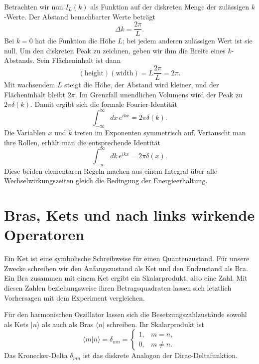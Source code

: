 Betrachten wir nun \(I_L(k)\) als Funktion auf der diskreten Menge der zulässigen \(k\)-Werte. Der Abstand benachbarter Werte beträgt
\begin{equation}
\Delta k=\frac{2\pi}{L}.
\end{equation}
Bei \(k=0\) hat die Funktion die Höhe \(L\); bei jedem anderen zulässigen Wert ist sie null. Um den diskreten Peak zu zeichnen, geben wir ihm die Breite eines \(k\)-Abstands. Sein Flächeninhalt ist dann
\begin{equation}
(\text{height})(\text{width})
=L\frac{2\pi}{L}=2\pi.
\end{equation}
Mit wachsendem \(L\) steigt die Höhe, der Abstand wird kleiner, und der Flächeninhalt bleibt \(2\pi\). Im Grenzfall unendlichen Volumens wird der Peak zu \(2\pi\delta(k)\). Damit ergibt sich die formale Fourier-Identität
\begin{equation}
\int_{-\infty}^{\infty}dx\,e^{ikx}=2\pi\delta(k).
\end{equation}
Die Variablen \(x\) und \(k\) treten im Exponenten symmetrisch auf. Vertauscht man ihre Rollen, erhält man die entsprechende Identität
\begin{equation}
\int_{-\infty}^{\infty}dk\,e^{ikx}=2\pi\delta(x).
\end{equation}
Diese beiden elementaren Regeln machen aus einem Integral über alle Wechselwirkungszeiten gleich die Bedingung der Energieerhaltung.

\section{Bras, Kets und nach links wirkende Operatoren}

Ein Ket ist eine symbolische Schreibweise für einen Quantenzustand. Für unsere Zwecke schreiben wir den Anfangszustand als Ket und den Endzustand als Bra. Ein Bra zusammen mit einem Ket ergibt ein Skalarprodukt, also eine Zahl. Mit diesen Zahlen beziehungsweise ihren Betragsquadraten lassen sich letztlich Vorhersagen mit dem Experiment vergleichen.

\begin{classroomqa}
\end{classroomqa}

Für den harmonischen Oszillator lassen sich die Besetzungszahlzustände sowohl als Kets \(\lvert n\rangle\) als auch als Bras \(\langle n\rvert\) schreiben. Ihr Skalarprodukt ist
\begin{equation}
\langle m\vert n\rangle=\delta_{mn}
=\begin{cases}
1,&m=n,\\
0,&m\neq n.
\end{cases}
\end{equation}
Das Kronecker-Delta \(\delta_{mn}\) ist das diskrete Analogon der Dirac-Deltafunktion.

